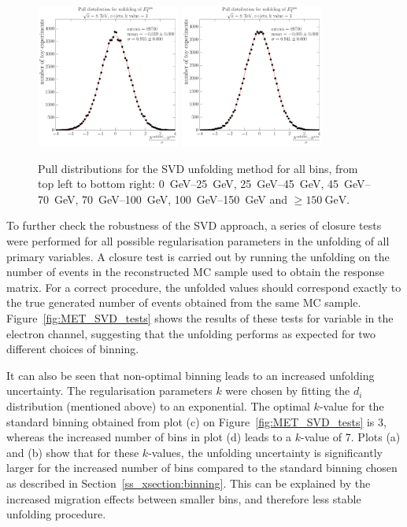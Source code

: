 \begin{figure}[hbtp]
    \includegraphics[width=0.42\textwidth]{unfolding_performance/pulls/pull_from_files_bin_4_stats_89700}
    \includegraphics[width=0.42\textwidth]{unfolding_performance/pulls/pull_from_files_bin_5_stats_89700}
    \caption[Pull distributions for the SVD unfolding]{Pull distributions for the SVD unfolding method for all \MET
    bins, from top left to bottom right: \SIrange{0}{25}{\GeV}, \SIrange{25}{45}{\GeV}, \SIrange{45}{70}{\GeV},
    \SIrange{70}{100}{\GeV}, \SIrange{100}{150}{\GeV} and $\geq \SI{150}{\GeV}$.}
    \label{fig:MET_SVD_pull}
\end{figure}

To further check the robustness of the SVD approach, a series of closure tests were performed for all possible
regularisation parameters in the unfolding of all primary variables. A closure test is carried out by running the
unfolding on the number of \ttbar events in the reconstructed MC sample used to obtain the response matrix. For a
correct procedure, the unfolded values should correspond exactly to the true generated number of events obtained from
the same MC sample. Figure~\ref{fig:MET_SVD_tests} shows the results of these tests for \MET variable in the electron
channel, suggesting that the unfolding performs as expected for two different choices of binning.

It can also be seen that non-optimal binning leads to an increased unfolding uncertainty. The regularisation parameters
$k$ were chosen by fitting the $d_i$ distribution (mentioned above) to an exponential. The optimal $k$-value for the
standard \MET binning obtained from plot (c) on Figure~\ref{fig:MET_SVD_tests} is \num{3}, whereas the increased number
of bins in plot (d) leads to a $k$-value of \num{7}. Plots (a) and (b) show that for these $k$-values, the unfolding
uncertainty is significantly larger for the increased number of \MET bins compared to the standard binning chosen as
described in Section~\ref{ss_xsection:binning}. This can be explained by the increased migration effects between smaller
bins, and therefore less stable unfolding procedure.

